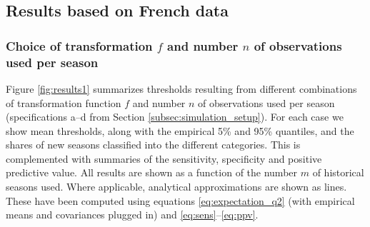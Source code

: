 \documentclass{article}
\begin{document}
\subsection{Results based on French data}

\subsubsection{Choice of transformation $f$ and number $n$ of observations used per season}

Figure \ref{fig:results1} summarizes thresholds resulting from different combinations of transformation function $f$ and number $n$ of observations used per season (specifications a--d from Section \ref{subsec:simulation_setup}). For each case we show mean thresholds, along with the empirical 5\% and 95\% quantiles, and the shares of new seasons classified into the different categories. This is complemented with summaries of the sensitivity, specificity and positive predictive value. All results are shown as a function of the number $m$ of historical seasons used. Where applicable, analytical approximations are shown as lines. These have been computed using equations \eqref{eq:expectation_q2} (with empirical means and covariances plugged in) and \eqref{eq:sens}--\eqref{eq:ppv}.
\end{document}
